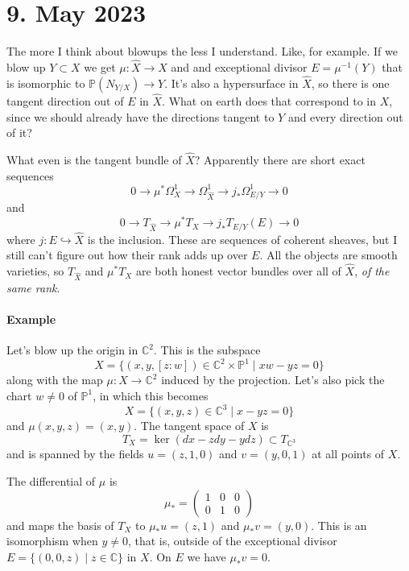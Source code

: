 \documentclass[11pt]{article}
\theoremstyle{definition}
\newcommand{\kk}[1]{\mathbb{#1}}
\begin{document}
\section{9. May 2023}

The more I think about blowups the less I understand.
Like, for example. If we blow up $Y \subset X$ we get $\mu : \widehat X \to X$
and and exceptional divisor $E = \mu^{-1}(Y)$ that is isomorphic to $\kk
P(N_{Y/X}) \to Y$.
It's also a hypersurface in $\widehat X$, so there is one tangent direction out
of $E$ in $\widehat X$.
What on earth does that correspond to in $X$, since we should already have the
directions tangent to $Y$ and every direction out of it?

What even is the tangent bundle of $\widehat X$?
Apparently there are short exact sequences
$$
0 \to \mu^*\Omega^1_X \to \Omega^1_{\widehat X} \to j_* \Omega^1_{E/Y} \to 0
$$
and
$$
0 \to T_{\widehat X} \to \mu^* T_X \to j_*T_{E/Y}(E) \to 0
$$
where $j : E \hookrightarrow \widehat X$ is the inclusion.
These are sequences of coherent sheaves, but I still can't figure out how their
rank adds up over $E$.
All the objects are smooth varieties, so $T_{\widehat X}$ and $\mu^* T_X$ are
both honest vector bundles over all of $\widehat X$, \emph{of the same rank}.


\paragraph{Example}

Let's blow up the origin in $\kk C^2$.
This is the subspace
$$
X = \{(x,y,[z:w]) \in \kk C^2 \times \kk P^1 \mid xw - yz = 0 \}
$$
along with the map $\mu : X \to \kk C^2$ induced by the projection.
Let's also pick the chart $w \not= 0$ of $\kk P^1$, in which this becomes
$$
X = \{(x,y,z) \in \kk C^3 \mid x - yz = 0 \}
$$
and $\mu(x,y,z) = (x,y)$.
The tangent space of $X$ is
$$
T_X = \ker (dx - z dy - y dz) \subset T_{\kk C^3}
$$
and is spanned by the fields $u = (z,1,0)$ and $v = (y,0,1)$ at all points of $X$.

The differential of $\mu$ is
$$
\mu_* = \begin{pmatrix}
1 & 0 & 0
\\
0 & 1 & 0
\end{pmatrix}
$$
and maps the basis of $T_X$ to $\mu_* u = (z,1)$ and $\mu_* v = (y,0)$.
This is an isomorphism when $y \not= 0$, that is, outside of the exceptional
divisor $E = \{(0,0,z) \mid z \in \kk C \}$ in $X$.
On $E$ we have $\mu_* v = 0$.
\end{document}
